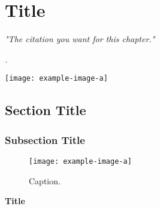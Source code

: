 
\chapter[\textcolor{darkblue}{Title in toc}]{Title}

\label{chapter:1}
\parbox[c][5cm][c]{9cm}{

\vspace*{4cm}
\textit{"The citation you want for this chapter."} 

\vspace*{0.2cm}
\begin{tBox}
\textit{\large \lipsum[1-2].}
\end{tBox}
\vspace*{0.2cm}
}

\vspace*{9cm}

\begin{minipage}[c][5cm][c]{9cm}
    \centering
    \texttt{[image: example-image-a]}
    \label{fig:banner_2}
\end{minipage}

\clearpage


\section{Section Title}

\subsection{Subsection Title}

\lipsum[1]

\begin{figure}[h!]
    \centering
    \texttt{[image: example-image-a]}
    \caption[Caption in the toc]{Caption.}
    \label{fig:figname}
\end{figure}

\lipsum[2]

\begin{eve}
    \lipsum[1]
\end{eve}

\begin{definition}{\textbf{Title}}
    \lipsum[2]
\label{def:name}

\end{definition}

